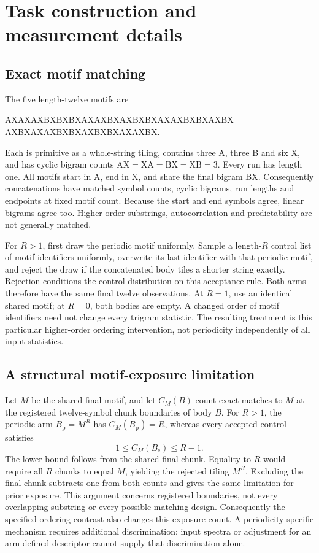 \section{Task construction and measurement details}
\label{app:protocol}

\subsection{Exact motif matching}
The five length-twelve motifs are
\begin{center}\small\ttfamily
AXAXAXBXBXBX\quad AXAXBXAXBXBX\quad AXAXBXBXAXBX\\
AXBXAXAXBXBX\quad AXBXBXAXAXBX.
\end{center}
Each is primitive as a whole-string tiling, contains three A, three B and six X, and has cyclic bigram counts $\mathrm{AX}=\mathrm{XA}=\mathrm{BX}=\mathrm{XB}=3$. Every run has length one. All motifs start in A, end in X, and share the final bigram BX. Consequently concatenations have matched symbol counts, cyclic bigrams, run lengths and endpoints at fixed motif count. Because the start and end symbols agree, linear bigrams agree too. Higher-order substrings, autocorrelation and predictability are not generally matched.

For $R>1$, first draw the periodic motif uniformly. Sample a length-$R$ control list of motif identifiers uniformly, overwrite its last identifier with that periodic motif, and reject the draw if the concatenated body tiles a shorter string exactly. Rejection conditions the control distribution on this acceptance rule. Both arms therefore have the same final twelve observations. At $R=1$, use an identical shared motif; at $R=0$, both bodies are empty. A changed order of motif identifiers need not change every trigram statistic. The resulting treatment is this particular higher-order ordering intervention, not periodicity independently of all input statistics.

\subsection{A structural motif-exposure limitation}
\label{app:motif-exposure}
Let $M$ be the shared final motif, and let $C_M(B)$ count exact matches to $M$ at the registered twelve-symbol chunk boundaries of body $B$. For $R>1$, the periodic arm $B_{\mathrm p}=M^R$ has $C_M(B_{\mathrm p})=R$, whereas every accepted control satisfies
\[
1\le C_M(B_{\mathrm c})\le R-1.
\]
The lower bound follows from the shared final chunk. Equality to $R$ would require all $R$ chunks to equal $M$, yielding the rejected tiling $M^R$. Excluding the final chunk subtracts one from both counts and gives the same limitation for prior exposure. This argument concerns registered boundaries, not every overlapping substring or every possible matching design. Consequently the specified ordering contrast also changes this exposure count. A periodicity-specific mechanism requires additional discrimination; input spectra or adjustment for an arm-defined descriptor cannot supply that discrimination alone.

